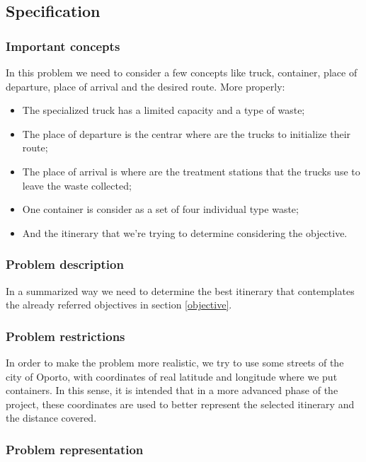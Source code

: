 \documentclass[a4paper]{article}
\begin{document}
\subsection{Specification}
\subsubsection{Important concepts}

In this problem we need to consider a few concepts like truck, container, place of departure, place of arrival and the desired route. More properly:

\begin{itemize}
	\item The specialized truck has a limited capacity and a type of waste;
	\item The place of departure is the centrar where are the trucks to initialize their route;
	\item The place of arrival is where are the treatment stations that the trucks use to leave the waste collected;
	\item One container is consider as a set of four individual type waste;
	\item And the itinerary that we're trying to determine considering the objective. 
\end{itemize}

\subsubsection{Problem description}

In a summarized way we need to determine the best itinerary that contemplates the already referred objectives in section \ref{objective}.

\subsubsection{Problem restrictions}

In order to make the problem more realistic, we try to use some streets of the city of Oporto, with coordinates of real latitude and longitude where we put containers. In this sense, it is intended that in a more advanced phase of the project, these coordinates are used to better represent the selected itinerary and the distance covered. 

\subsubsection{Problem representation}
\end{document}
